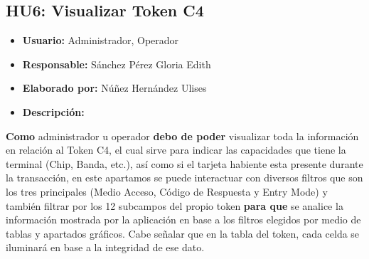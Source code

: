 \subsection{HU6: Visualizar Token C4}
\begin{itemize}
	\item \textbf{Usuario:} Administrador, Operador
	\item \textbf{Responsable:} Sánchez Pérez Gloria Edith
	\item \textbf{Elaborado por:} Núñez Hernández Ulises
	\item \textbf{Descripción:}
\end{itemize}
\textbf{Como} administrador u operador \textbf{debo de poder} visualizar toda la información en relación al Token C4, el cual sirve para indicar las capacidades que tiene la terminal (Chip, Banda, etc.), así como si el tarjeta habiente esta presente durante la transacción, en este apartamos se puede interactuar con diversos filtros que son los tres principales (Medio Acceso, Código de Respuesta y Entry Mode) y también filtrar por los 12 subcampos del propio token \textbf{para que} se analice la información mostrada por la aplicación en base a los filtros elegidos por medio de tablas y apartados gráficos. Cabe señalar que en la tabla del token, cada celda se iluminará en base a la integridad de ese dato. 